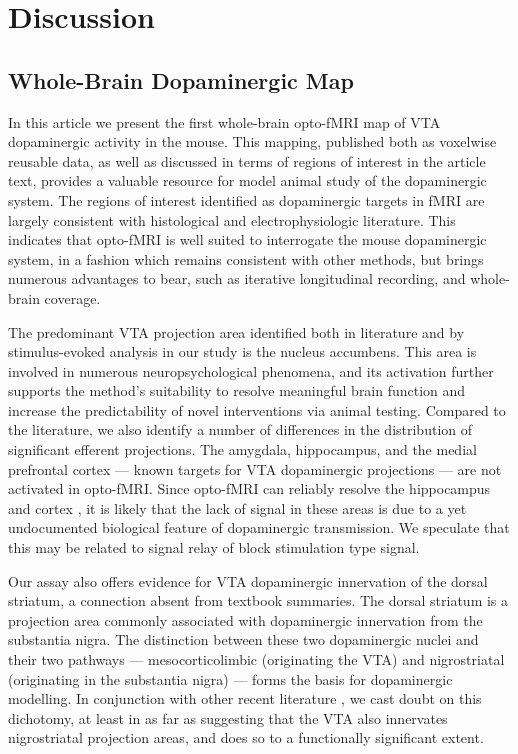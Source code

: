 \section{Discussion}

\subsection{Whole-Brain Dopaminergic Map}

In this article we present the first whole-brain opto-fMRI map of VTA dopaminergic activity in the mouse.
This mapping, published both as voxelwise reusable data, as well as discussed in terms of regions of interest in the article text, provides a valuable resource for model animal study of the dopaminergic system.
The regions of interest identified as dopaminergic targets in fMRI are largely consistent with histological and electrophysiologic literature.
This indicates that opto-fMRI is well suited to interrogate the mouse dopaminergic system, in a fashion which remains consistent with other methods, but brings numerous advantages to bear, such as iterative longitudinal recording, and whole-brain coverage.

The predominant VTA projection area identified both in literature and by stimulus-evoked analysis in our study is the nucleus accumbens.
This area is involved in numerous neuropsychological phenomena, and its activation further supports the method's suitability to resolve meaningful brain function and increase the predictability of novel interventions via animal testing.
Compared to the literature, we also identify a number of differences in the distribution of significant efferent projections.
The amygdala, hippocampus, and the medial prefrontal cortex --- known targets for VTA dopaminergic projections --- are not activated in opto-fMRI.
Since opto-fMRI can reliably resolve the hippocampus and cortex \cite{Lebhardt2015,Grandjean2019}, it is likely that the lack of signal in these areas is due to a yet undocumented biological feature of dopaminergic transmission.
We speculate that this may be related to signal relay of block stimulation type signal.

Our assay also offers evidence for VTA dopaminergic innervation of the dorsal striatum, a connection absent from textbook summaries.
The dorsal striatum is a projection area commonly associated with dopaminergic innervation from the substantia nigra.
The distinction between these two dopaminergic nuclei and their two pathways --- mesocorticolimbic (originating the VTA) and nigrostriatal (originating in the substantia nigra) --- forms the basis for dopaminergic modelling.
In conjunction with other recent literature \cite{Lohani2016,Pan2010}, we cast doubt on this dichotomy, at least in as far as suggesting that the VTA also innervates nigrostriatal projection areas, and does so to a functionally significant extent.

